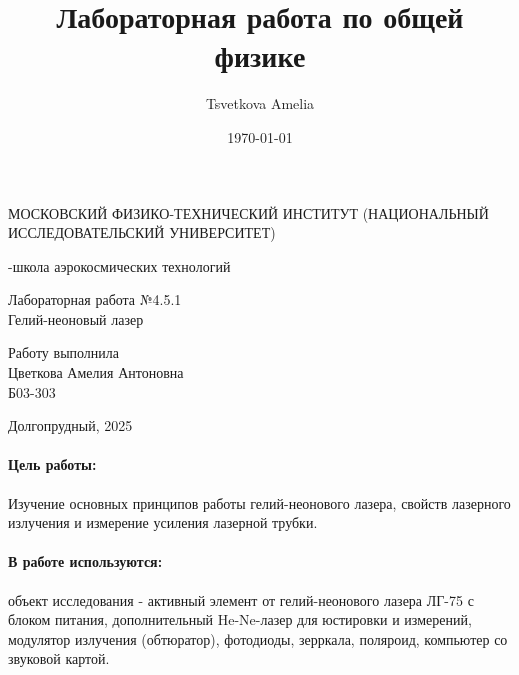 \documentclass[a4paper,12pt]{article}
\author{Tsvetkova Amelia}
\title{Лабораторная работа по общей физике}
\date{\today}
\begin{document}
\begin{titlepage}
    \newpage
    \begin{center}
    {\large МОСКОВСКИЙ ФИЗИКО-ТЕХНИЧЕСКИЙ ИНСТИТУТ (НАЦИОНАЛЬНЫЙ ИССЛЕДОВАТЕЛЬСКИЙ УНИВЕРСИТЕТ)}
    \vspace{1cm}

    {-школа аэрокосмических технологий}
    \vspace{6em}
    \end{center}
    
    \vspace{1.2em}

    \begin{center}
    \Large Лабораторная работа №4.5.1 \\
    Гелий-неоновый лазер
    \linebreak
    \end{center}
    
    \vspace{11em}
    
    \begin{flushright}
                       {\large Работу выполнила\\
                       Цветкова Амелия Антоновна\\
                       Б03-303 }
    \end{flushright}

    \vspace{\fill}

    \begin{center}
    Долгопрудный, 2025
    \end{center}

    \end{titlepage}

\paragraph{Цель работы:} Изучение основных принципов работы гелий-неонового лазера, свойств лазерного излучения и измерение усиления лазерной трубки.

\paragraph{В работе используются:} объект исследования - активный элемент от гелий-неонового лазера ЛГ-75 с блоком питания, дополнительный He-Ne-лазер для юстировки и измерений, модулятор излучения (обтюратор), фотодиоды, зерркала, поляроид, компьютер со звуковой картой.
\end{document}
